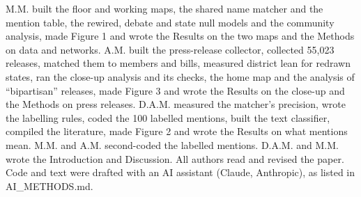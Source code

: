M.M. built the floor and working maps, the shared name matcher and the mention table, the rewired, debate and state
null models and the community analysis, made Figure 1 and wrote the Results on the two maps and the Methods on data
and networks. A.M. built the press-release collector, collected 55,023 releases, matched them to members and bills,
measured district lean for redrawn states, ran the close-up analysis and its checks, the home map and the analysis
of ``bipartisan'' releases, made Figure 3 and wrote the Results on the close-up and the Methods on press releases.
D.A.M. measured the matcher's precision, wrote the labelling rules, coded the 100 labelled mentions, built the text
classifier, compiled the literature, made Figure 2 and wrote the Results on what mentions mean. M.M. and A.M. second-coded
the labelled mentions. D.A.M. and M.M. wrote the Introduction and Discussion. All authors read and revised the
paper. Code and text were drafted with an AI assistant (Claude, Anthropic), as listed in AI\_METHODS.md.
